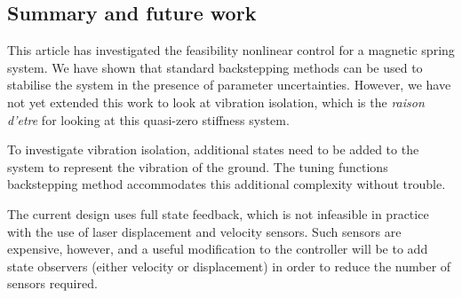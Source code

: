 \subsection{Summary and future work}

This article has investigated the feasibility nonlinear
control for a magnetic spring system. We have shown that standard
backstepping methods can be used to stabilise the system in the
presence of parameter uncertainties. However, we have not yet extended
this work to look at vibration isolation, which is the \emph{raison
  d'etre} for looking at this quasi-zero stiffness system.

To investigate vibration isolation, additional states need to be added
to the system to represent the vibration of the ground. The tuning
functions backstepping method accommodates this additional complexity
without trouble.

The current design uses full state feedback, which is not infeasible
in practice with the use of laser displacement and velocity
sensors. Such sensors are expensive, however, and a useful
modification to the controller will be to add state observers (either
velocity or displacement) in order to reduce the number of sensors
required.






